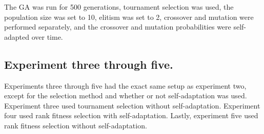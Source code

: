 The GA was run for 500 generations, tournament selection was used, the population size was set to 10, elitism was set to 2, crossover and mutation were performed separately, and the crossover and mutation probabilities were self-adapted over time.

\subsection[Experiment Three through Five]{Experiment three through five.}

Experiments three through five had the exact same setup as experiment two, except for the selection method and whether or not self-adaptation was used. Experiment three used tournament selection without self-adaptation. Experiment four used rank fitness selection with self-adaptation. Lastly, experiment five used rank fitness selection without self-adaptation. 

% 
% 
% 
% 
% 


